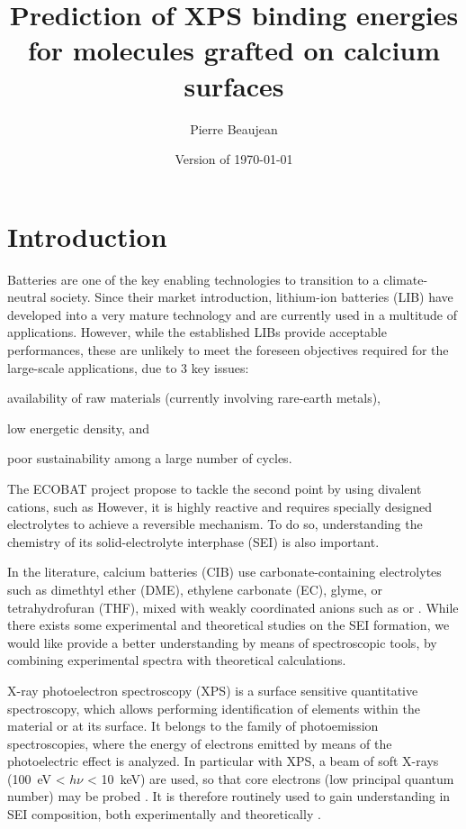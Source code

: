 \documentclass[12pt,a4paper]{article}
\title{Prediction of XPS binding energies for molecules grafted on calcium surfaces}
\author{Pierre Beaujean}
\date{Version of \today}
\begin{document}
\maketitle

\section{Introduction}

Batteries are one of the key enabling technologies to transition to a climate-neutral society. Since their market introduction, lithium-ion batteries (LIB) have developed into a very mature technology and are currently used in a multitude of applications. However, while the established LIBs provide acceptable performances, these are unlikely to meet the foreseen objectives required for the large-scale applications, due to 3 key issues: \begin{inparaenum}[i)]
	\item availability of raw materials (currently involving rare-earth metals), 
	\item low energetic density, and 
	\item poor sustainability among a large number of cycles. 
\end{inparaenum}
The ECOBAT project propose to tackle the second point by using divalent cations, such as   However, it is highly reactive and requires specially designed electrolytes to achieve a reversible mechanism. To do so, understanding the chemistry of its solid-electrolyte interphase (SEI) is also important. 

In the literature, calcium batteries (CIB)  use carbonate-containing electrolytes such as  dimethtyl ether (DME), ethylene carbonate (EC), glyme, or tetrahydrofuran (THF), mixed with weakly coordinated anions such as  or  \cite{zhaoRevealingSolidElectrolyte2022,taghavi-kahaghPoweringFutureComprehensive2023}.  While there exists some experimental \cite{melemedImpactDifferentialCa22023} and theoretical \cite{hahnCriticalRoleConfigurational2020,liepinyaComputationalComparisonEther2021,pathreekerWhyTetrahydrofuranGood2021,yamijalaStabilityCalciumIon2021} studies on the SEI  formation, we would like provide a better understanding by means of spectroscopic tools, by combining experimental spectra with theoretical calculations.

X-ray photoelectron spectroscopy (XPS) is a surface sensitive quantitative spectroscopy, which allows performing identification of elements within the material or at its surface. It belongs to the family of photoemission spectroscopies, where the energy of electrons emitted by means of the photoelectric effect is analyzed. In particular with XPS, a beam of soft X-rays (\SI{100}{\electronvolt} < $h\nu$ < \SI{10}{\kilo\electronvolt}) are used, so that core electrons (low principal quantum number) may be probed \cite{stevieIntroductionXrayPhotoelectron2020}.  It is therefore routinely used to gain understanding in SEI composition, both experimentally \cite{melemedImpactDifferentialCa22023} and theoretically \cite{ebadiInsightsLiMetalOrganic2019}.
\end{document}
